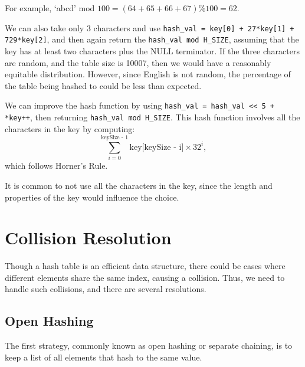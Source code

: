 For example, `abcd' mod \(100 = (64 + 65 + 66 + 67) \% 100 = 62\). 

We can also take only 3 characters and use \verb|hash_val = key[0] + 27*key[1] + 729*key[2]|, and then again return the \verb|hash_val mod H_SIZE|, assuming that the key has at least two characters plus the NULL terminator. If the three characters are random, and the table size is 10007, then we would have a reasonably equitable distribution. However, since English is not random, the percentage of the table being hashed to could be less than expected. 

We can improve the hash function by using \verb|hash_val = hash_val << 5 + *key++|, then returning \verb|hash_val mod H_SIZE|. This hash function involves all the characters in the key by computing:
\[
  \sum_{i = 0}^{\text{keySize - 1}} \text{key[keySize - i]} \times 32^{i},
\]
which follows Horner's Rule.

It is common to not use all the characters in the key, since the length and properties of the key would influence the choice.

\section{Collision Resolution}
Though a hash table is an efficient data structure, there could be cases where different elements share the same index, causing a collision. Thus, we need to handle such collisions, and there are several resolutions.

\subsection{Open Hashing}
The first strategy, commonly known as open hashing or separate chaining, is to keep a list of all elements that hash to the same value.

